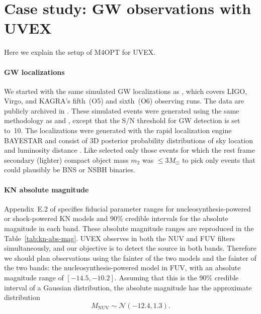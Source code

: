 \documentclass[twocolumn,times]{aastex631}
\begin{document}
\section{Case study: GW observations with UVEX}

Here we explain the setup of \ac{M4OPT} for \ac{UVEX}.

\paragraph{\Ac{GW} localizations}
We started with the same simulated \ac{GW} localizations as \citet{2025arXiv250114109C}, which covers LIGO, Virgo, and KAGRA's fifth~(O5) and sixth~(O6) observing runs. The data are publicly archived in \cite{r_weizmann_2025_14585837}. These simulated events were generated using the same methodology as \citet{2022ApJ...924...54P} and \citet{2023ApJ...958..158K}, except that the \ac{S/N} threshold for \ac{GW} detection is set to~10. The localizations were generated with the rapid localization engine BAYESTAR \citep{2016PhRvD..93b4013S} and consist of 3D posterior probability distributions of sky location and luminosity distance \citep{2016ApJ...829L..15S,2016ApJS..226...10S}. Like \citet{2025arXiv250114109C} selected only those events for which the rest frame secondary (lighter) compact object mass $m_2$ was $\leq 3 M_\odot$ to pick only events that could plausibly be \ac{BNS} or \ac{NSBH} binaries.

\paragraph{\Ac{KN} absolute magnitude}
Appendix~E.2 of \citet{2021arXiv211115608K} specifies fiducial parameter ranges for nucleosynthesis-powered or shock-powered \ac{KN} models and 90\% credible intervals for the absolute magnitude in each band. These absolute magnitude ranges are reproduced in the Table~\ref{tab:kn-abs-mag}. \ac{UVEX} observes in both the \ac{NUV} and \ac{FUV} filters simultaneously, and our objective is to detect the source in both bands. Therefore we should plan observations using the fainter of the two models and the fainter of the two bands: the nucleosynthesis-powered model in FUV, with an absolute magnitude range of $[-14.5, -10.2]$. Assuming that this is the 90\% credible interval of a Gaussian distribution, the absolute magnitude has the approximate distribution
%
\begin{equation}
    \label{eq:absmag-distn}
    M_\mathrm{NUV} \sim \mathcal{N}(-12.4, 1.3).
\end{equation}
\end{document}
